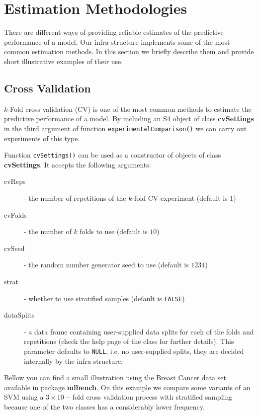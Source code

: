 \documentclass[10pt,a4paper]{article}\usepackage[]{graphicx}\usepackage[]{color}
\begin{document}
\section{Estimation Methodologies}\label{sec:expMeth}

There are different ways of providing reliable estimates of the
predictive performance of a model. Our infra-structure implements some
of the most common estimation methods. In this section we
briefly describe them and provide short illustrative examples of their
use.

\subsection{Cross Validation}

$k$-Fold cross validation (CV) is one of the most common 
methods to estimate the predictive performance of a model. By
including an S4 object of class \textbf{cvSettings} in the third
argument of function \texttt{experimentalComparison()} we can carry
out experiments of this type.

Function \texttt{cvSettings()} can be used as a constructor of objects
of class \textbf{cvSettings}. It accepts the following arguments:

\begin{description}
\item[cvReps] - the number of repetitions of the $k$-fold CV experiment (default is $1$)
\item[cvFolds] - the number of $k$ folds to use (default is $10$)
\item[cvSeed] - the random number generator seed to use (default is $1234$)
\item[strat] - whether to use stratified samples (default is \texttt{FALSE})
\item[dataSplits] - a data frame containing user-supplied data splits
  for each of the folds and repetitions (check the help page of the
  class for further details). This parameter defaults to
  \texttt{NULL}, i.e. no user-supplied splits, they are decided
  internally by the infra-structure.
\end{description}

Bellow you can find a small illustration using the Breast Cancer data
set available in package \textbf{mlbench}. On this example we compare
some variants of an SVM using a $3\times 10-$fold cross validation
process with stratified sampling because one of the two classes has a
considerably lower frequency.
\end{document}
